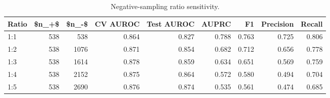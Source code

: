 \begin{table}[htbp]
\centering
\caption{Negative-sampling ratio sensitivity.}
\label{tab:robustness_recomputed}
\begin{tabular}{lrrrrrrrr}
\toprule
Ratio & \$n\_+\$ & \$n\_-\$ & CV AUROC & Test AUROC & AUPRC & F1 & Precision & Recall \\
\midrule
1:1 & 538 & 538 & 0.864 & 0.827 & 0.788 & 0.763 & 0.725 & 0.806 \\
1:2 & 538 & 1076 & 0.871 & 0.854 & 0.682 & 0.712 & 0.656 & 0.778 \\
1:3 & 538 & 1614 & 0.878 & 0.859 & 0.634 & 0.651 & 0.569 & 0.759 \\
1:4 & 538 & 2152 & 0.875 & 0.864 & 0.572 & 0.580 & 0.494 & 0.704 \\
1:5 & 538 & 2690 & 0.876 & 0.874 & 0.535 & 0.561 & 0.474 & 0.685 \\
\bottomrule
\end{tabular}

\end{table}
